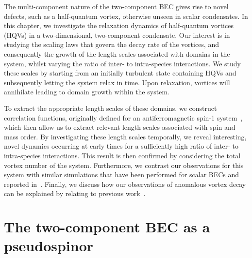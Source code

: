 The multi-component nature of the two-component BEC gives rise to novel defects,
such as a half-quantum vortex, otherwise unseen in scalar condensates. 
In this chapter, we investigate the relaxation dynamics of half-quantum vortices 
(HQVs) in a two-dimensional, two-component condensate. 
Our interest is in studying the scaling laws that govern the decay rate of the 
vortices, and consequently the growth of the length scales associated with 
domains in the system, whilst varying the ratio of inter- to intra-species 
interactions. 
We study these scales by starting from an initially turbulent state containing
HQVs and subsequently letting the system relax in time.
Upon relaxation, vortices will annihilate leading to domain growth within 
the system.

To extract the appropriate length scales of these domains, we construct 
correlation functions, originally defined for an antiferromagnetic spin-1 
system~\cite{Symes2017}, which then allow us to extract relevant length scales
associated with spin and mass order.
By investigating these length scales temporally, we reveal interesting, 
novel dynamics occurring at early times for a sufficiently high ratio of 
inter- to intra-species interactions. 
This result is then confirmed by considering the total vortex number of the 
system. 
Furthermore, we contrast our observations for this system with similar
simulations that have been performed for scalar BECs and reported
in~\cite{Schole2012, Nowak2012, Karl2017}.
Finally, we discuss how our observations of anomalous vortex decay can be
explained by relating to previous work~\cite{Eto2011, Kasamatsu2016}.


\section{The two-component BEC as a pseudospinor}

